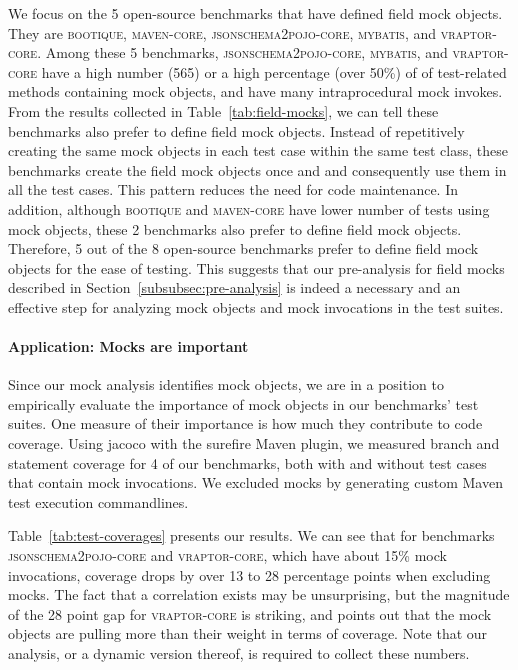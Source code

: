 We focus on the 5 open-source benchmarks that have defined field mock objects. They are \textsc{bootique}, \textsc{maven-core}, \textsc{jsonschema2pojo-core}, \textsc{mybatis}, and \textsc{vraptor-core}. Among these 5 benchmarks, \textsc{jsonschema2pojo-core}, \textsc{mybatis}, and \textsc{vraptor-core} have a high number (565) or a high percentage (over 50\%) of of test-related methods containing mock objects, and have many intraprocedural mock invokes. From the results collected in Table~\ref{tab:field-mocks}, we can tell these benchmarks also prefer to define field mock objects. Instead of repetitively creating the same mock objects in each test case within the same test class, these benchmarks create the field mock objects once and and consequently use them in all the test cases. This pattern reduces the need for code maintenance. In addition, although \textsc{bootique} and \textsc{maven-core} have lower number of tests using mock objects, these 2 benchmarks also prefer to define field mock objects. Therefore, 5 out of the 8 open-source benchmarks prefer to define field mock objects for the ease of testing. This suggests that our pre-analysis for field mocks described in Section~\ref{subsubsec:pre-analysis} is indeed a necessary and an effective step for analyzing mock objects and mock invocations in the test suites.

\paragraph{Application: Mocks are important} Since our mock analysis identifies mock objects, we are in a position to empirically evaluate the importance of mock objects in our benchmarks' test suites. One measure of their importance is how much they contribute to code coverage. Using jacoco with the surefire Maven plugin, we measured branch and statement coverage for 4 of our benchmarks, both with and without test cases that contain mock invocations. We excluded mocks by generating custom Maven test execution commandlines. 

Table~\ref{tab:test-coverages} presents our results. We can see that for benchmarks \textsc{jsonschema2pojo-core} and \textsc{vraptor-core}, which have about 15\% mock invocations, coverage drops by over 13 to 28 percentage points when excluding mocks. The fact that a correlation exists may be unsurprising, but the magnitude of the 28 point gap for \textsc{vraptor-core} is striking, and points out that the mock objects are pulling more than their weight in terms of coverage. Note that our analysis, or a dynamic version thereof, is required to collect these numbers. 

